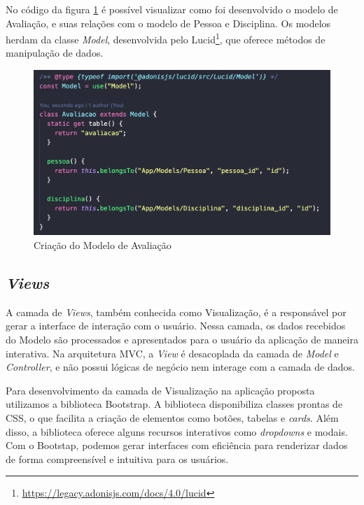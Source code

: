 No código da figura \ref{fig:fig_cod_model_avaliacao} é possível visualizar como foi desenvolvido o modelo de Avaliação, e suas relações com o modelo de Pessoa e Disciplina. Os modelos herdam da classe \textit{Model}, desenvolvida pelo Lucid\footnote{\url{https://legacy.adonisjs.com/docs/4.0/lucid}}, que oferece métodos de manipulação de dados.

\begin{figure}[h]
  \centering
  \includegraphics[width=1\textwidth]{imagens/codigo-model-avaliacao.png}
  \caption{Criação do Modelo de Avaliação}
  \label{fig:fig_cod_model_avaliacao}
\end{figure}

\subsection{\textit{Views}}

A camada de \textit{Views}, também conhecida como Visualização, é a responsável por gerar a interface de interação com o usuário. Nessa camada, os dados recebidos do Modelo são processados e apresentados para o usuário da aplicação de maneira interativa. Na arquitetura MVC, a \textit{View} é desacoplada da camada de \textit{Model} e \textit{Controller}, e não possui lógicas de negócio nem interage com a camada de dados.

Para desenvolvimento da camada de Visualização na aplicação proposta utilizamos a biblioteca Bootstrap. A biblioteca disponibiliza classes prontas de CSS, o que facilita a criação de elementos como botões, tabelas e \textit{cards}. Além disso, a biblioteca oferece alguns recursos interativos como \textit{dropdowns} e modais. Com o Bootstap, podemos gerar interfaces com eficiência para renderizar dados de forma compreensível e intuitiva para os usuários.


